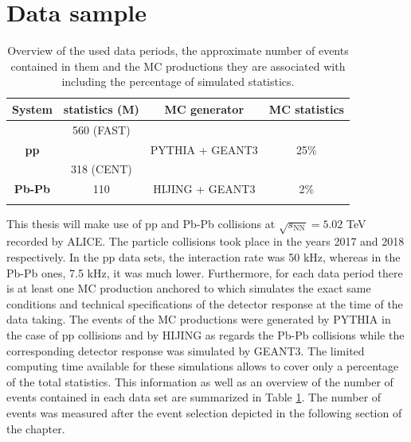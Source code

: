 \documentclass[12pt,a4paper]{report}
\begin{document}
\section{Data sample}
\begin{table}[tb!]
\centering
\renewcommand{\arraystretch}{1.5}
\begin{tabular}{c|c|c|c}
\toprule
\rowcolor{headerBlue} \textbf{System} & \textbf{statistics}  \textbf{(M)} & \textbf{MC generator} &  \textbf{MC statistics } \\
\midrule
             & 560 (FAST) & & \\
\textbf{pp}	 &	 &   PYTHIA + GEANT3  & 25\%  	 \\
 &  318 (CENT)   &  	\\
\hline
\textbf{Pb-Pb} & 110 &  HIJING + GEANT3  & 2\% \\
				 &	   & 		 \\
\bottomrule
\end{tabular}
\caption{Overview of the used data periods, the approximate number of events contained in them and the MC productions they are associated with including the percentage of simulated statistics.}
\label{tab:Periods}
\end{table} 
This thesis will make use of pp and Pb-Pb collisions at $\sqrt{s_\text{NN}}= 5.02$ TeV recorded by ALICE. The particle collisions took place in the years 2017 and 2018 respectively. In the pp data sets, the interaction rate was 50 kHz, whereas in the Pb-Pb ones, 7.5 kHz, it was much lower. Furthermore, for each data period there is at least one MC production anchored to which simulates the exact same conditions and technical specifications of the detector response at the time of the data taking. The events of the MC productions were generated by PYTHIA in the case of pp collisions and by  HIJING as regards the Pb-Pb collisions while the corresponding detector response was simulated by GEANT3. The limited computing time available for these simulations allows to cover only a percentage of the total statistics. This information as well as an overview of the number of events contained in each data set are summarized in Table \ref{tab:Periods}. The number of events was measured after the event selection depicted in the following section of the chapter.\\
\end{document}
